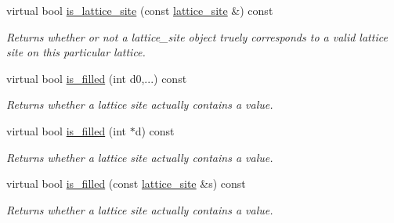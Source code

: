 \begin{DoxyCompactItemize}
\mbox{\label{classsisl_1_1cartesian__cubic_af82ea6f5e243e9a24ba95bb37b796546}} 
virtual bool \hyperlink{classsisl_1_1cartesian__cubic_af82ea6f5e243e9a24ba95bb37b796546}{is\+\_\+lattice\+\_\+site} (const \hyperlink{namespacesisl_acd18feee4026583db6185df2b25434aa}{lattice\+\_\+site} \&) const
\begin{DoxyCompactList}\small\item\em Returns whether or not a lattice\+\_\+site object truely corresponds to a valid lattice site on this particular lattice. \end{DoxyCompactList}\item 
\mbox{\label{classsisl_1_1cartesian__cubic_af1915dc2bc734e06d3cfff17d7da1a7f}} 
virtual bool \hyperlink{classsisl_1_1cartesian__cubic_af1915dc2bc734e06d3cfff17d7da1a7f}{is\+\_\+filled} (int d0,...) const
\begin{DoxyCompactList}\small\item\em Returns whether a lattice site actually contains a value. \end{DoxyCompactList}\item 
\mbox{\label{classsisl_1_1cartesian__cubic_a7fcd8a7cc29bc4857c384b9c9d5040d9}} 
virtual bool \hyperlink{classsisl_1_1cartesian__cubic_a7fcd8a7cc29bc4857c384b9c9d5040d9}{is\+\_\+filled} (int $\ast$d) const
\begin{DoxyCompactList}\small\item\em Returns whether a lattice site actually contains a value. \end{DoxyCompactList}\item 
\mbox{\label{classsisl_1_1cartesian__cubic_a68f4f410e2711d3cf1e4066679f1910d}} 
virtual bool \hyperlink{classsisl_1_1cartesian__cubic_a68f4f410e2711d3cf1e4066679f1910d}{is\+\_\+filled} (const \hyperlink{namespacesisl_acd18feee4026583db6185df2b25434aa}{lattice\+\_\+site} \&s) const
\begin{DoxyCompactList}\small\item\em Returns whether a lattice site actually contains a value. \end{DoxyCompactList}\item 
\mbox{\label{classsisl_1_1cartesian__cubic_a6e462e0f77044a855df84a3323660bff}} 

\end{DoxyCompactItemize}
